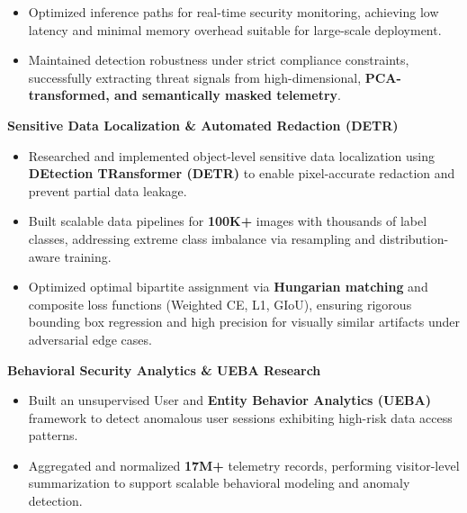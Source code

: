 \begin{cventries}
{\begin{cvitems}
\begin{itemize}
{            without reliance on labeled attack data or static signatures.
          }
          \item {
            Optimized inference paths for real-time security monitoring, 
            achieving low latency and minimal memory overhead suitable for large-scale deployment.
          }
          \item {
            Maintained detection robustness under strict compliance constraints,  
            successfully extracting threat signals from high-dimensional, 
            \textbf{PCA-transformed, and semantically masked telemetry}.
          }
        \end{itemize}
      \vspace{0.5mm}
      \item {\textbf{Sensitive Data Localization \& Automated Redaction (DETR)}}
        \begin{itemize}
          \item {
            Researched and implemented object-level sensitive data localization using 
            \textbf{DEtection TRansformer (DETR)} 
            to enable pixel-accurate redaction and prevent partial data leakage.
          }
          \item {
            Built scalable data pipelines for \textbf{100K+} images with thousands of label classes, 
            addressing extreme class imbalance via resampling and distribution-aware training.
          }
          \item {
            Optimized optimal bipartite assignment via \textbf{Hungarian matching} and 
            composite loss functions (Weighted CE, L1, GIoU), 
            ensuring rigorous bounding box regression and high precision for 
            visually similar artifacts under adversarial edge cases.
          }
        \end{itemize}
      \vspace{0.5mm}
      \item {\textbf{Behavioral Security Analytics \& UEBA Research}}
        \begin{itemize}
          \item {
            Built an unsupervised User and \textbf{Entity Behavior Analytics (UEBA)} framework to 
            detect anomalous user sessions exhibiting high-risk data access patterns.
          }
          \item {
            Aggregated and normalized \textbf{17M+} telemetry records, 
            performing visitor-level summarization to support scalable behavioral modeling and anomaly detection.
}
\end{itemize}
\end{cvitems}}
\end{cventries}
